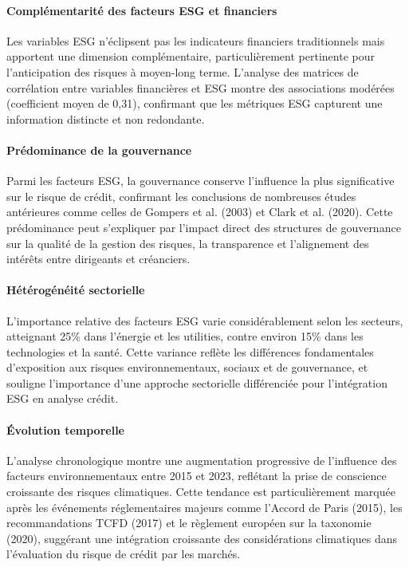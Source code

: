 \paragraph{Complémentarité des facteurs ESG et financiers} Les variables ESG n'éclipsent pas les indicateurs financiers traditionnels mais apportent une dimension complémentaire, particulièrement pertinente pour l'anticipation des risques à moyen-long terme. L'analyse des matrices de corrélation entre variables financières et ESG montre des associations modérées (coefficient moyen de 0,31), confirmant que les métriques ESG capturent une information distincte et non redondante.

\paragraph{Prédominance de la gouvernance} Parmi les facteurs ESG, la gouvernance conserve l'influence la plus significative sur le risque de crédit, confirmant les conclusions de nombreuses études antérieures comme celles de Gompers et al. (2003) et Clark et al. (2020). Cette prédominance peut s'expliquer par l'impact direct des structures de gouvernance sur la qualité de la gestion des risques, la transparence et l'alignement des intérêts entre dirigeants et créanciers.

\paragraph{Hétérogénéité sectorielle} L'importance relative des facteurs ESG varie considérablement selon les secteurs, atteignant 25\% dans l'énergie et les utilities, contre environ 15\% dans les technologies et la santé. Cette variance reflète les différences fondamentales d'exposition aux risques environnementaux, sociaux et de gouvernance, et souligne l'importance d'une approche sectorielle différenciée pour l'intégration ESG en analyse crédit.

\paragraph{Évolution temporelle} L'analyse chronologique montre une augmentation progressive de l'influence des facteurs environnementaux entre 2015 et 2023, reflétant la prise de conscience croissante des risques climatiques. Cette tendance est particulièrement marquée après les événements réglementaires majeurs comme l'Accord de Paris (2015), les recommandations TCFD (2017) et le règlement européen sur la taxonomie (2020), suggérant une intégration croissante des considérations climatiques dans l'évaluation du risque de crédit par les marchés.


